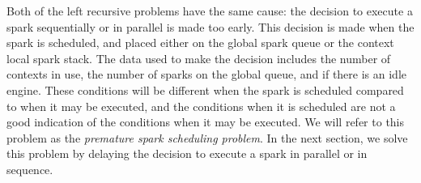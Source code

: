 Both of the left recursive problems have the same cause:
the decision to execute a spark sequentially or in parallel is
made too early.
This decision is made when the spark is scheduled,
and placed either on the global spark queue or the context local spark
stack.
The data used to make the decision includes the number of contexts in
use,
the number of sparks on the global queue,
and if there is an idle engine.
These conditions will be different when the spark is scheduled compared
to when it may be executed,
and the conditions when it is scheduled are not a good indication of
the conditions when it may be executed.
We will refer to this problem as the \emph{premature spark scheduling problem}.
In the next section,
we solve this problem by delaying the decision to execute a spark in
parallel or in sequence.


